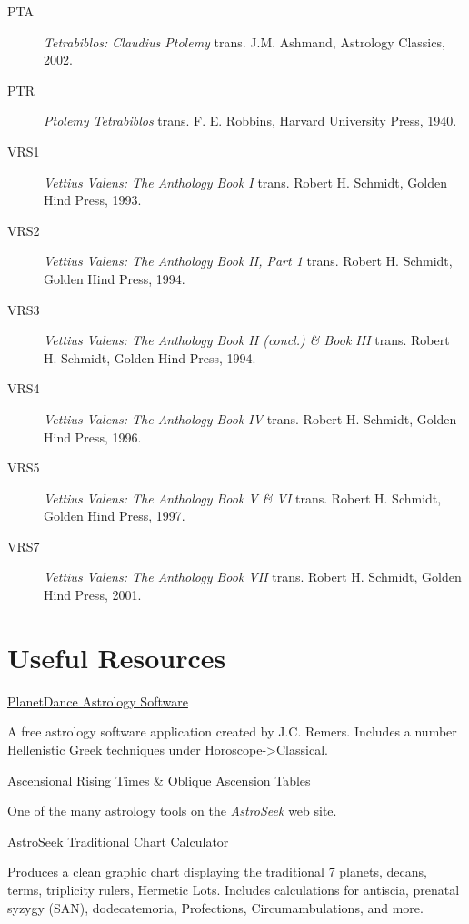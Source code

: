 \begin{description}
\item[PTA]
	\textsl{Tetrabiblos: Claudius Ptolemy} trans. J.M. Ashmand, Astrology Classics, 2002.
	
\item[PTR]
	\textit{Ptolemy Tetrabiblos} trans.  F. E. Robbins, Harvard University Press, 1940.
	
\item[VRS1] 
	\textsl{Vettius Valens: The Anthology Book I} trans. Robert H. Schmidt, Golden Hind Press, 1993.

\item[VRS2] 
	\textsl{Vettius Valens: The Anthology Book II, Part 1} trans. Robert H. Schmidt, Golden Hind Press, 1994.

\item[VRS3] 
	\textsl{Vettius Valens: The Anthology Book II (concl.) \& Book III} trans. Robert H. Schmidt, Golden Hind Press, 1994.

\item[VRS4] 
	\textsl{Vettius Valens: The Anthology Book IV} trans. Robert H. Schmidt, Golden Hind Press, 1996.

\item[VRS5] 
	\textsl{Vettius Valens: The Anthology Book V \& VI} trans. Robert H. Schmidt, Golden Hind Press, 1997.

\item[VRS7] 
	\textsl{Vettius Valens: The Anthology Book VII} trans. Robert H. Schmidt, Golden Hind Press, 2001.

\end{description}
\newpage

\section{Useful Resources}

\noindent\href{https://www.jcremers.com/}{PlanetDance Astrology Software}

	A free astrology software application created by J.C. Remers. Includes a number Hellenistic Greek techniques under Horoscope->Classical.

	
	\noindent\href{https://horoscopes.astro-seek.com/calculate-ascensional-rising-times/?latitude=&narozeni_lat_custom_stupne=0&narozeni_lat_custom_minuty=0&narozeni_lat_custom_smer=0&narozeni_rok=2022&aya=&oa=&decimal=0}{Ascensional Rising Times \& Oblique Ascension Tables}
	
	One of the many astrology tools on the \textsl{AstroSeek} web site.
	
\noindent\href{https://horoscopes.astro-seek.com/traditional-astrology}{AstroSeek Traditional Chart Calculator}

Produces a clean graphic chart displaying the traditional 7 planets, decans, terms, triplicity rulers, Hermetic Lots. Includes calculations for antiscia, prenatal syzygy (SAN), dodecatemoria, Profections, Circumambulations, and more. 
	
\newpage
